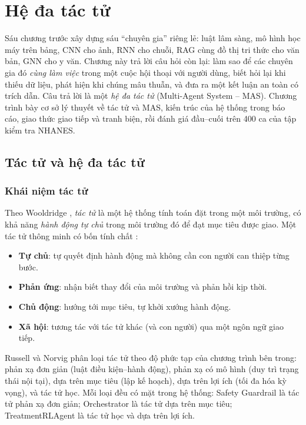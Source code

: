 \chapter{Hệ đa tác tử}
\label{chap:mas}

Sáu chương trước xây dựng sáu ``chuyên gia'' riêng lẻ: luật lâm sàng, mô hình học máy trên bảng, CNN cho ảnh, RNN cho chuỗi, RAG cùng đồ thị tri thức cho văn bản, GNN cho y văn. Chương này trả lời câu hỏi còn lại: làm sao để các chuyên gia đó \emph{cùng làm việc} trong một cuộc hội thoại với người dùng, biết hỏi lại khi thiếu dữ liệu, phát hiện khi chúng mâu thuẫn, và đưa ra một kết luận an toàn có trích dẫn. Câu trả lời là một \emph{hệ đa tác tử} (Multi-Agent System – MAS). Chương trình bày cơ sở lý thuyết về tác tử và MAS, kiến trúc của hệ thống trong báo cáo, giao thức giao tiếp và tranh biện, rồi đánh giá đầu–cuối trên 400 ca của tập kiểm tra NHANES.

\section{Tác tử và hệ đa tác tử}

\subsection{Khái niệm tác tử}

Theo Wooldridge \cite{wooldridge2009}, \emph{tác tử} là một hệ thống tính toán đặt trong một môi trường, có khả năng \emph{hành động tự chủ} trong môi trường đó để đạt mục tiêu được giao. Một tác tử thông minh có bốn tính chất \cite{jennings1998}:
\begin{itemize}
  \item \textbf{Tự chủ}: tự quyết định hành động mà không cần con người can thiệp từng bước.
  \item \textbf{Phản ứng}: nhận biết thay đổi của môi trường và phản hồi kịp thời.
  \item \textbf{Chủ động}: hướng tới mục tiêu, tự khởi xướng hành động.
  \item \textbf{Xã hội}: tương tác với tác tử khác (và con người) qua một ngôn ngữ giao tiếp.
\end{itemize}
Russell và Norvig \cite{russell2021} phân loại tác tử theo độ phức tạp của chương trình bên trong: phản xạ đơn giản (luật điều kiện–hành động), phản xạ có mô hình (duy trì trạng thái nội tại), dựa trên mục tiêu (lập kế hoạch), dựa trên lợi ích (tối đa hóa kỳ vọng), và tác tử học. Mỗi loại đều có mặt trong hệ thống: Safety Guardrail là tác tử phản xạ đơn giản; Orchestrator là tác tử dựa trên mục tiêu; TreatmentRLAgent là tác tử học và dựa trên lợi ích.

